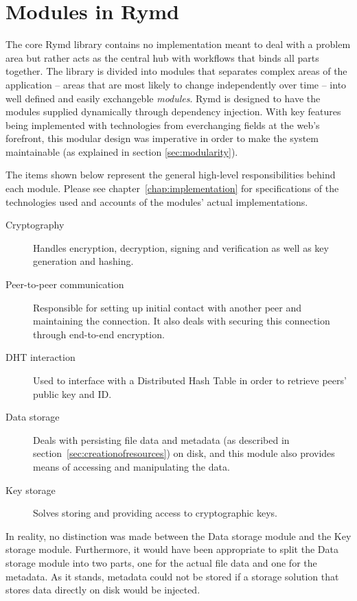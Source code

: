 \section{Modules in Rymd}
\label{sec:modules}


The core Rymd library contains no implementation meant to deal with a problem area but rather acts as the central hub with workflows that binds all parts together. The library is divided into modules that separates complex areas of the application – areas that are most likely to change independently over time – into well defined and easily exchangeble \emph{modules}. Rymd is designed to have the modules supplied dynamically through dependency injection. With key features being implemented with technologies from everchanging fields at the web's forefront, this modular design was imperative in order to make the system maintainable (as explained in section \ref{sec:modularity}).

The items shown below represent the general high-level responsibilities behind each module. Please see chapter~\ref{chap:implementation} for specifications of the technologies used and accounts of the modules' actual implementations.

\begin{description}
  \item [Cryptography] Handles encryption, decryption, signing and verification as well as key generation and hashing.
  \item [Peer-to-peer communication] Responsible for setting up initial contact with another peer and maintaining the connection. It also deals with securing this connection through end-to-end encryption.
  \item [DHT interaction] Used to interface with a Distributed Hash Table in order to retrieve peers' public key and ID.
  \item [Data storage] Deals with persisting file data and metadata (as described in section~\ref{sec:creationofresources}) on disk, and this module also provides means of accessing and manipulating the data.
  \item [Key storage] Solves storing and providing access to cryptographic keys.
\end{description}

In reality, no distinction was made between the Data storage module and the Key storage module. Furthermore, it would have been appropriate to split the Data storage module into two parts, one for the actual file data and one for the metadata. As it stands, metadata could not be stored if a storage solution that stores data directly on disk would be injected.
